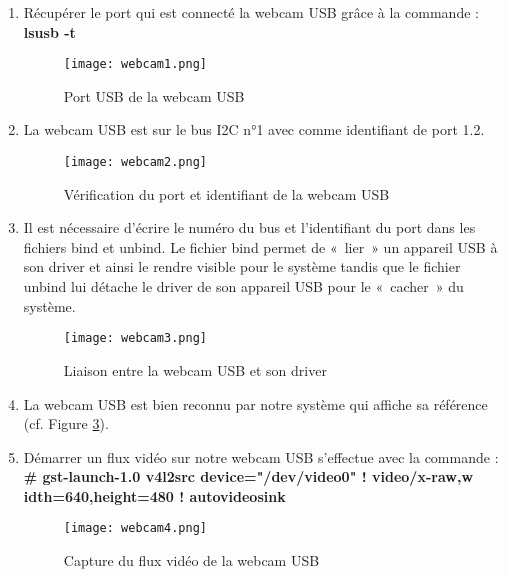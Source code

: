 \begin{enumerate}
  \item Récupérer le port qui est connecté la webcam USB grâce à la commande :
  \textbf{lsusb -t}
\begin{figure}[th]
    \centering
    \texttt{[image: webcam1.png]}
    \decoRule
    \caption{Port USB de la webcam USB}  \label{fig:webcam1}
\end{figure}

\item La webcam USB est sur le bus I2C n°1 avec comme identifiant de port 1.2.
\begin{figure}[th]
    \centering
    \texttt{[image: webcam2.png]}
    \decoRule
    \caption{Vérification du port et identifiant de la webcam USB}  \label{fig:webcam2}
\end{figure}

\item Il est nécessaire d'écrire le numéro du bus et l’identifiant du port dans les fichiers bind
et unbind. Le fichier bind permet de  « lier » un appareil USB à son driver et
ainsi le rendre visible pour le système tandis que le fichier unbind lui détache
le driver de son appareil USB pour le « cacher » du système.
\begin{figure}[th]
    \centering
    \texttt{[image: webcam3.png]}
    \decoRule
    \caption{Liaison entre la webcam USB et son driver}  \label{fig:webcam3}
\end{figure}

\item La webcam USB est bien reconnu par notre système qui affiche sa
référence (cf. Figure \ref{fig:webcam3}).

\item Démarrer un flux vidéo sur notre webcam USB s'effectue avec la commande :
\textbf{\# gst-launch-1.0 v4l2src device="/dev/video0" ! video/x-raw,w
idth=640,height=480 ! autovideosink}

\begin{figure}[th]
    \centering
    \texttt{[image: webcam4.png]}
    \decoRule
    \caption{Capture du flux vidéo de la webcam USB}  \label{fig:webcam4}
\end{figure}


\end{enumerate}
